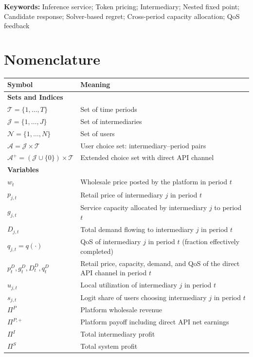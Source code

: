\documentclass[11pt,a4paper]{article}
\newcommand{\qos}{q}
\newcommand{\T}{\mathcal{T}}
\newcommand{\J}{\mathcal{J}}
\newcommand{\N}{\mathcal{N}}
\newcommand{\A}{\mathcal{A}}
\newcommand{\D}{D}
\begin{document}
\noindent\textbf{Keywords:} Inference service; Token pricing; Intermediary; Nested fixed point; Candidate response; Solver-based regret; Cross-period capacity allocation; QoS feedback

\section*{Nomenclature}
\label{sec:nomenclature}

\begin{longtable}{@{}p{}p{}@{}}
\toprule
Symbol & Meaning \\
\midrule
\endhead
\multicolumn{2}{l}{\textbf{Sets and Indices}} \\
$\T=\{1,\ldots,T\}$ & Set of time periods \\
$\J=\{1,\ldots,J\}$ & Set of intermediaries \\
$\N=\{1,\ldots,N\}$ & Set of users \\
$\A=\J\times\T$ & User choice set: intermediary--period pairs \\
$\A^+=(\J\cup\{0\})\times\T$ & Extended choice set with direct API channel \\
\midrule
\multicolumn{2}{l}{\textbf{Variables}} \\
$w_t$ & Wholesale price posted by the platform in period $t$ \\
$p_{j,t}$ & Retail price of intermediary $j$ in period $t$ \\
$g_{j,t}$ & Service capacity allocated by intermediary $j$ to period $t$ \\
$\D_{j,t}$ & Total demand flowing to intermediary $j$ in period $t$ \\
$q_{j,t}=\qos(\cdot)$ & QoS of intermediary $j$ in period $t$ (fraction effectively completed) \\
$p^D_t,g^D_t,\D^D_t,q^D_t$ & Retail price, capacity, demand, and QoS of the direct API channel in period $t$ \\
$u_{j,t}$ & Local utilization of intermediary $j$ in period $t$ \\
$s_{j,t}$ & Logit share of users choosing intermediary $j$ in period $t$ \\
$\Pi^P$ & Platform wholesale revenue \\
$\Pi^{P,+}$ & Platform payoff including direct API net earnings \\
$\Pi^I$ & Total intermediary profit \\
$\Pi^S$ & Total system profit \\

\end{longtable}
\end{document}
